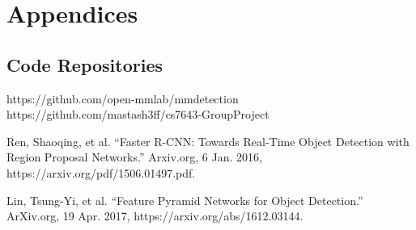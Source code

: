 \documentclass[10pt,twocolumn,letterpaper]{article}
\begin{document}
\section{Appendices}
\subsection{Code Repositories}
https://github.com/open-mmlab/mmdetection
https://github.com/mastash3ff/cs7643-GroupProject


{\small


}
Ren, Shaoqing, et al. “Faster R-CNN: Towards Real-Time Object Detection with Region Proposal Networks.” Arxiv.org, 6 Jan. 2016, https://arxiv.org/pdf/1506.01497.pdf. 

Lin, Tsung-Yi, et al. “Feature Pyramid Networks for Object Detection.” ArXiv.org, 19 Apr. 2017, https://arxiv.org/abs/1612.03144. 
\end{document}
